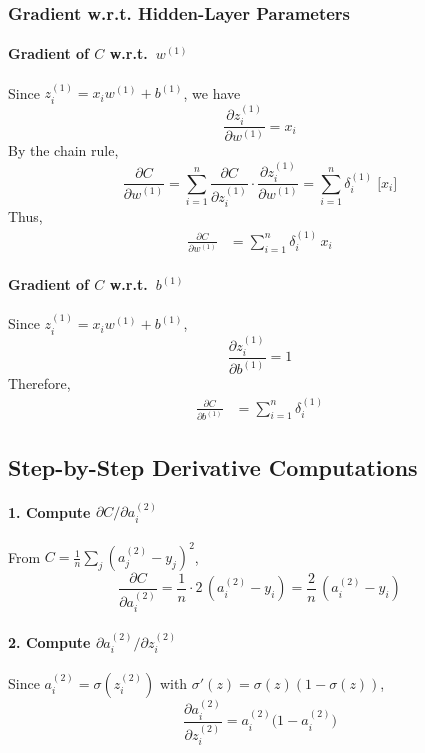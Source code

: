 \documentclass{article}
\begin{document}
\subsubsection{Gradient w.r.t. Hidden-Layer Parameters}\label{sec:grad-hidden}

\paragraph{Gradient of \(C\) w.r.t.\ \(w^{(1)}\)\\}
Since \(z_i^{(1)} = x_i w^{(1)} + b^{(1)}\), we have
\[
    \frac{\partial z_i^{(1)}}{\partial w^{(1)}} = x_i
\]
By the chain rule,
\[
    \frac{\partial C}{\partial w^{(1)}}
    = \sum_{i=1}^{n} \frac{\partial C}{\partial z_i^{(1)}} \cdot \frac{\partial z_i^{(1)}}{\partial w^{(1)}}
    = \sum_{i=1}^{n} \delta_i^{(1)} \;\bigl[x_i\bigr]
\]
Thus,
\begin{align}
    \frac{\partial C}{\partial w^{(1)}}
    &= \sum_{i=1}^{n} \delta_i^{(1)}\,x_i
    \label{eq:grad-w1}
\end{align}

\paragraph{Gradient of \(C\) w.r.t.\ \(b^{(1)}\)\\}
Since \(z_i^{(1)} = x_i w^{(1)} + b^{(1)}\),
\[
    \frac{\partial z_i^{(1)}}{\partial b^{(1)}} = 1
\]
Therefore,
\begin{align}
    \frac{\partial C}{\partial b^{(1)}}
    &= \sum_{i=1}^{n} \delta_i^{(1)}
    \label{eq:grad-b1}
\end{align}

\subsection{Step-by-Step Derivative Computations}\label{sec:two-neuron-stepwise}

\paragraph{1. Compute \(\partial C/\partial a_i^{(2)}\)\\}
From \(C = \tfrac{1}{n}\sum_{j}{(a_j^{(2)} - y_j)}^2\),
\[
    \frac{\partial C}{\partial a_i^{(2)}}
    = \frac{1}{n} \cdot 2\,(a_i^{(2)} - y_i)
    = \frac{2}{n}\,(a_i^{(2)} - y_i)
\]

\paragraph{2. Compute \(\partial a_i^{(2)}/\partial z_i^{(2)}\)\\}
Since \(a_i^{(2)} = \sigma(z_i^{(2)})\) with \(\sigma'(z) = \sigma(z)(1 - \sigma(z))\),
\[
    \frac{\partial a_i^{(2)}}{\partial z_i^{(2)}} = a_i^{(2)}\bigl(1 - a_i^{(2)}\bigr)
\]
\end{document}
